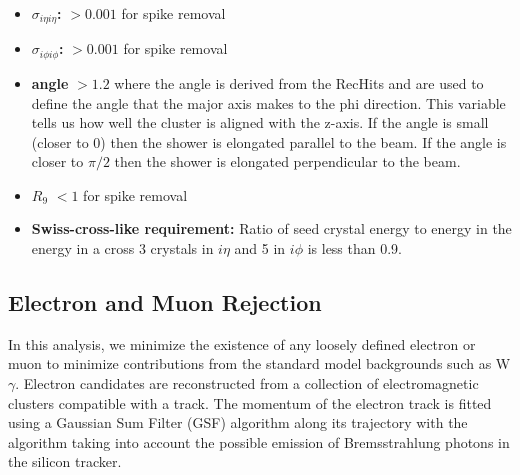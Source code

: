 \begin{itemize}
\item {\bf $\sigma_{i{\eta}i{\eta}}$: } $> 0.001$ for spike removal
\item {\bf $\sigma_{i{\phi}i{\phi}}$: } $> 0.001$ for spike removal
\item {\bf angle} $>1.2$ where the angle is derived from the RecHits and are used to define the angle that the major axis makes to the phi direction. This variable tells us how well the cluster is aligned with the z-axis. If the angle is small (closer to 0) then the shower is elongated parallel to the beam. If the angle is closer to $\pi/2$ then the shower is elongated perpendicular to the beam.
\item {\bf $R_9$ } $< 1$ for spike removal
\item {\bf Swiss-cross-like requirement:} Ratio of seed crystal energy to energy in the energy in a  cross 3 crystals in $i{\eta}$ and 5 in $i{\phi}$ is less than 0.9. %
\end{itemize}


\subsection{Electron and Muon Rejection}

\label{sec:lepton}

In this analysis, we minimize the existence of any loosely defined electron or muon to minimize contributions from the standard model backgrounds such as W$\gamma$.  Electron candidates are reconstructed from a collection of electromagnetic clusters compatible with  a track. The momentum of the electron track is fitted using a Gaussian Sum Filter (GSF) algorithm along its trajectory with the algorithm taking into account the possible emission of Bremsstrahlung photons in the silicon tracker. 

